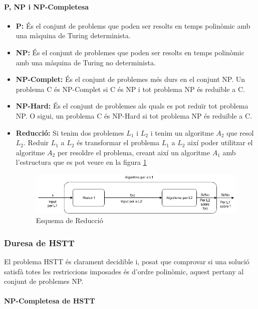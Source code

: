 \documentclass[11pt,a4paper,twoside]{report}
\begin{document}
    \paragraph*{P, NP i NP-Completesa}
    \begin{itemize}
      \item \textbf{P: }És el conjunt de problems que poden ser resolts en temps polinòmic amb una màquina de Turing determinista. 
      \item \textbf{NP: }És el conjunt de problemes que poden ser resolts en temps polinòmic amb una màquina de Turing no determinista. 
      \item \textbf{NP-Complet: }És el conjunt de problemes més durs en el conjunt NP. Un problema C és NP-Complet si C és NP i tot problema NP és reduïble a C.
      \item \textbf{NP-Hard: }És el conjunt de problemes als quals es pot reduïr tot problema NP. O sigui, un problema C és NP-Hard si tot problema NP és reduïble a C. 
      \item \textbf{Reducció: }Si tenim dos problemes $L_1$ i $L_2$  i tenim un algoritme $A_2$ que resol $L_2$. Reduir $L_1$ a $L_2$ és transformar el problema $L_1$ a $L_2$ així poder utilitzar el algoritme $A_2$ per resoldre el problema, creant així un algoritme $A_1$ amb l'estructura que es pot veure en la figura \ref{fig:reduccio}
      \begin{figure}[ht!]
        \includegraphics[width=\textwidth]{Diagrames/Reduccio.png}
        \caption{Esquema de Reducció}
        \label{fig:reduccio}
      \end{figure}
      
    \end{itemize}

    \subsubsection{Duresa de HSTT}
    El problema HSTT és clarament decidible i, posat que comprovar si una solució satisfà totes les restriccions imposades és d'ordre polinòmic, aquest pertany al conjunt de problemes NP.
    
    \paragraph*{NP-Completesa de HSTT} ~\\
\end{document}
